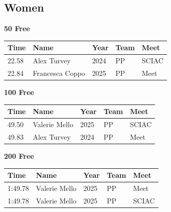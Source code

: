 \subsection{Women}
\vspace{1.2em}
\noindent\begin{minipage}[t]{0.98\textwidth}
\centering
\textbf{\textcolor{teamprimary}{50 Free}}\par
\vspace{0.5em}
\centering
\small
\renewcommand{\arraystretch}{1.0}
\setlength{\tabcolsep}{4pt}
\begin{tabular}{@{}p{2.5cm}p{4.5cm}p{1.5cm}p{2.5cm}p{2.5cm}@{}}
\toprule
\textbf{Time} & \textbf{Name} & \textbf{Year} & \textbf{Team} & \textbf{Meet} \\
\midrule
22.58 & Alex Turvey & 2024 & PP & SCIAC \\
22.84 & Francesca Coppo & 2025 & PP & Meet \\
\bottomrule
\end{tabular}
\end{minipage}
\vspace{1.2em}
\noindent\begin{minipage}[t]{0.98\textwidth}
\centering
\textbf{\textcolor{teamprimary}{100 Free}}\par
\vspace{0.5em}
\centering
\small
\renewcommand{\arraystretch}{1.0}
\setlength{\tabcolsep}{4pt}
\begin{tabular}{@{}p{2.5cm}p{4.5cm}p{1.5cm}p{2.5cm}p{2.5cm}@{}}
\toprule
\textbf{Time} & \textbf{Name} & \textbf{Year} & \textbf{Team} & \textbf{Meet} \\
\midrule
49.50 & Valerie Mello & 2025 & PP & SCIAC \\
49.83 & Alex Turvey & 2024 & PP & Meet \\
\bottomrule
\end{tabular}
\end{minipage}
\vspace{1.2em}
\noindent\begin{minipage}[t]{0.98\textwidth}
\centering
\textbf{\textcolor{teamprimary}{200 Free}}\par
\vspace{0.5em}
\centering
\small
\renewcommand{\arraystretch}{1.0}
\setlength{\tabcolsep}{4pt}
\begin{tabular}{@{}p{2.5cm}p{4.5cm}p{1.5cm}p{2.5cm}p{2.5cm}@{}}
\toprule
\textbf{Time} & \textbf{Name} & \textbf{Year} & \textbf{Team} & \textbf{Meet} \\
\midrule
1:49.78 & Valerie Mello & 2025 & PP & Meet \\
1:49.78 & Valerie Mello & 2025 & PP & SCIAC \\
\bottomrule
\end{tabular}
\end{minipage}
